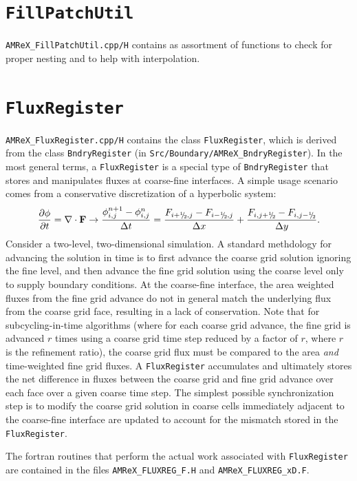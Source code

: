 \section{{\tt FillPatchUtil}}
{\tt AMReX\_FillPatchUtil.cpp/H} contains as assortment of functions to check for proper nesting
and to help with interpolation.

\section{{\tt FluxRegister}}

{\tt AMReX\_FluxRegister.cpp/H} contains the class {\tt FluxRegister}, which is derived from
the class {\tt BndryRegister} (in {\tt Src/Boundary/AMReX\_BndryRegister}).
In the most general terms, a {\tt FluxRegister} is a special type of {\tt BndryRegister} that
stores and manipulates fluxes at coarse-fine interfaces.
A simple usage scenario comes from a conservative discretization of a hyperbolic system:
\begin{equation}
\frac{\partial\phi}{\partial t} = \nabla\cdot{\bf F}
\rightarrow
\frac{\phi_{i,j}^{n+1}-\phi_{i,j}^n}{\Delta t} = \frac{F_{i+\myhalf,j}-F_{i-\myhalf,j}}{\Delta x} + \frac{F_{i,j+\myhalf} - F_{i,j-\myhalf}}{\Delta y}.
\end{equation}
Consider a two-level, two-dimensional simulation.  A standard methdology for advancing the solution in 
time is to first advance the coarse grid solution ignoring the fine level, and then advance the fine 
grid solution using the coarse level only to supply boundary conditions.  At the coarse-fine interface, 
the area weighted fluxes from the fine grid advance do not in general match the underlying flux from 
the coarse grid face, resulting in a lack of conservation.  Note that for subcycling-in-time algorithms
(where for each coarse grid advance, the fine grid is advanced $r$ times using a coarse grid time step 
reduced by a factor of $r$, where $r$ is the refinement ratio), the coarse grid flux must 
be compared to the area {\it and} time-weighted fine grid fluxes.  A {\tt FluxRegister} accumulates 
and ultimately stores the net difference in fluxes between the coarse grid and fine grid advance over 
each face over a given coarse time step.  The simplest possible synchronization step is to modify
the coarse grid solution in coarse cells immediately adjacent to the coarse-fine interface are updated
to account for the mismatch stored in the {\tt FluxRegister}.

The fortran routines that perform the actual work associated with {\tt FluxRegister} are 
contained in the files {\tt AMReX\_FLUXREG\_F.H} and {\tt AMReX\_FLUXREG\_xD.F}.

